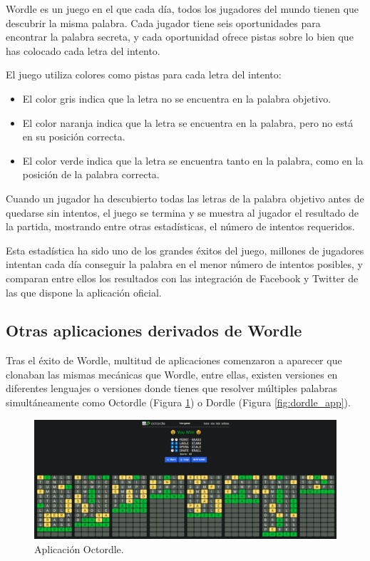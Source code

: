 Wordle es un juego en el que cada día, todos los jugadores del mundo tienen que descubrir la misma palabra.
Cada jugador tiene seis oportunidades para encontrar la palabra secreta, y cada oportunidad ofrece pistas sobre lo bien que has colocado cada letra del intento.

El juego utiliza colores como pistas para cada letra del intento:
\begin{itemize}
	\item El color gris indica que la letra no se encuentra en la palabra objetivo.
	\item El color naranja indica que la letra se encuentra en la palabra, pero no está en su posición correcta.
	\item El color verde indica que la letra se encuentra tanto en la palabra, como en la posición de la palabra correcta.
\end{itemize}

Cuando un jugador ha descubierto todas las letras de la palabra objetivo antes de quedarse sin intentos, el juego se termina y se muestra al jugador el resultado de la partida, mostrando entre otras estadísticas, el número de intentos requeridos.

Esta estadística ha sido uno de los grandes éxitos del juego, millones de jugadores intentan cada día conseguir la palabra en el menor número de intentos posibles, y comparan entre ellos los resultados con las integración de Facebook y Twitter de las que dispone la aplicación oficial.


\subsection{Otras aplicaciones derivados de Wordle}

Tras el éxito de Wordle, multitud de aplicaciones comenzaron a aparecer que clonaban las mismas mecánicas que Wordle, entre ellas, existen versiones en diferentes lenguajes o versiones donde tienes que resolver múltiples palabras simultáneamente como Octordle (Figura \ref{fig:octordle_app}) o Dordle (Figura \ref{fig:dordle_app}).


\begin{figure}
	\centering
	\includegraphics[clip=true,width=\textwidth]{images/octordle.png}
	\caption{Aplicación Octordle.}
	\label{fig:octordle_app}
\end{figure}

